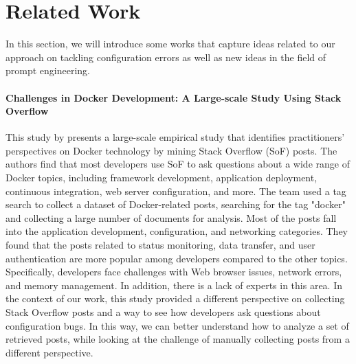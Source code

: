 \documentclass[english,bachelor]{swsLeipzig}
\begin{document}
\chapter{Related Work}\label{related_work}
In this section, we will introduce some works that capture ideas related to our approach on tackling configuration errors as well as new ideas in the field of prompt engineering.

\subsubsection{Challenges in Docker Development: A Large-scale Study Using Stack Overflow}
This study by \citet{haque:2020} presents a large-scale empirical study that identifies practitioners' perspectives on Docker technology by mining Stack Overflow (SoF) posts. The authors find that most developers use SoF to ask questions about a wide range of Docker topics, including framework development, application deployment, continuous integration, web server configuration, and more. The team used a tag search to collect a dataset of Docker-related posts, searching for the tag "docker" and collecting a large number of documents for analysis. Most of the posts fall into the application development, configuration, and networking categories. They found that the posts related to status monitoring, data transfer, and user authentication are more popular among developers compared to the other topics. Specifically, developers face challenges with Web browser issues, network errors, and memory management. In addition, there is a lack of experts in this area. In the context of our work, this study provided a different perspective on collecting Stack Overflow posts and a way to see how developers ask questions about configuration bugs. In this way, we can better understand how to analyze a set of retrieved posts, while looking at the challenge of manually collecting posts from a different perspective.
\end{document}
